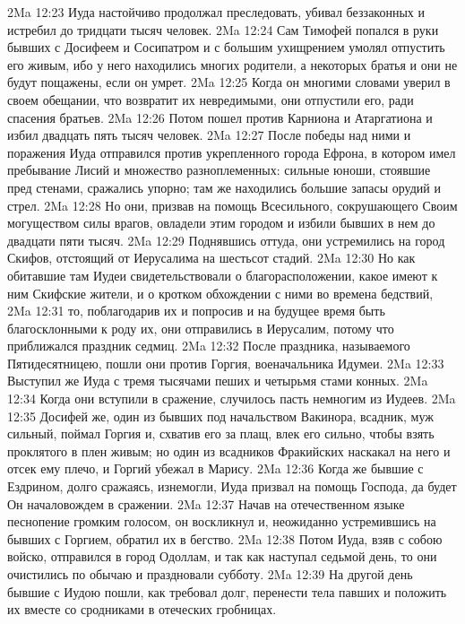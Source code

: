 \vs 2Ma 12:23 Иуда настойчиво продолжал преследовать, убивал беззаконных и истребил до тридцати тысяч человек.
\vs 2Ma 12:24 Сам Тимофей попался в руки бывших с Досифеем и Сосипатром и с большим ухищрением умолял отпустить его живым, ибо у него находились многих  родители, а некоторых братья и они не будут пощажены, если он умрет.
\vs 2Ma 12:25 Когда он многими словами уверил в своем обещании, что возвратит их невредимыми, они отпустили его, ради спасения братьев.
\rsbpar\vs 2Ma 12:26 Потом  пошел против Карниона и Атаргатиона и избил двадцать пять тысяч человек.
\vs 2Ma 12:27 После победы над ними и поражения Иуда отправился против укрепленного города Ефрона, в котором имел пребывание Лисий и множество разноплеменных: сильные юноши, стоявшие пред стенами, сражались упорно; там же находились большие запасы орудий и стрел.
\vs 2Ma 12:28 Но они, призвав на помощь Всесильного, сокрушающего Своим могуществом силы врагов, овладели этим городом и избили бывших в нем до двадцати пяти тысяч.
\vs 2Ma 12:29 Поднявшись оттуда, они устремились на город Скифов, отстоящий от Иерусалима на шестьсот стадий.
\vs 2Ma 12:30 Но как обитавшие там Иудеи свидетельствовали о благорасположении, какое имеют к ним Скифские жители, и о кротком обхождении с ними во времена бедствий,
\vs 2Ma 12:31 то, поблагодарив их и попросив и на будущее время быть благосклонными к роду их, они отправились в Иерусалим, потому что приближался праздник седмиц.
\rsbpar\vs 2Ma 12:32 После праздника, называемого Пятидесятницею, пошли они против Горгия, военачальника Идумеи.
\vs 2Ma 12:33 Выступил же Иуда с тремя тысячами пеших и четырьмя стами конных.
\vs 2Ma 12:34 Когда они вступили в сражение, случилось пасть немногим из Иудеев.
\vs 2Ma 12:35 Досифей же, один из бывших под начальством Вакинора, всадник, муж сильный, поймал Горгия и, схватив его за плащ, влек его сильно, чтобы взять проклятого в плен живым; но один из всадников Фракийских наскакал на него и отсек ему плечо, и Горгий убежал в Марису.
\vs 2Ma 12:36 Когда же бывшие с Ездрином, долго сражаясь, изнемогли, Иуда призвал на помощь Господа, да будет Он началовождем в сражении.
\vs 2Ma 12:37 Начав на отечественном языке песнопение громким голосом, он воскликнул и, неожиданно устремившись на бывших с Горгием, обратил их в бегство.
\rsbpar\vs 2Ma 12:38 Потом Иуда, взяв с собою войско, отправился в город Одоллам, и так как наступал седьмой день, то они очистились по обычаю и праздновали субботу.
\vs 2Ma 12:39 На другой день бывшие с Иудою пошли, как требовал долг, перенести тела павших и положить их вместе со сродниками в отеческих гробницах.
